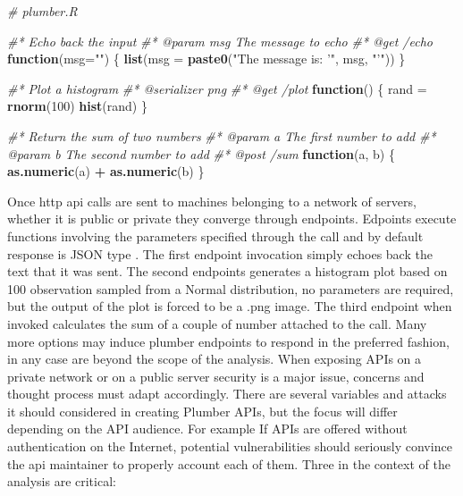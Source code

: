 \documentclass[
  12pt,
  a4paper,
  oneside]{book}
\newenvironment{Shaded}{\begin{snugshade}}{\end{snugshade}}
\newcommand{\CommentTok}[1]{\textcolor[rgb]{0.56,0.35,0.01}{\textit{#1}}}
\newcommand{\ControlFlowTok}[1]{\textcolor[rgb]{0.13,0.29,0.53}{\textbf{#1}}}
\newcommand{\DataTypeTok}[1]{\textcolor[rgb]{0.13,0.29,0.53}{#1}}
\newcommand{\DecValTok}[1]{\textcolor[rgb]{0.00,0.00,0.81}{#1}}
\newcommand{\KeywordTok}[1]{\textcolor[rgb]{0.13,0.29,0.53}{\textbf{#1}}}
\newcommand{\NormalTok}[1]{#1}
\newcommand{\OperatorTok}[1]{\textcolor[rgb]{0.81,0.36,0.00}{\textbf{#1}}}
\newcommand{\StringTok}[1]{\textcolor[rgb]{0.31,0.60,0.02}{#1}}
\theoremstyle{definition}
\theoremstyle{definition}
\theoremstyle{definition}
\theoremstyle{remark}
\begin{document}
\begin{Shaded}
\begin{Highlighting}[]
\CommentTok{# plumber.R}

\CommentTok{#* Echo back the input}
\CommentTok{#* @param msg The message to echo}
\CommentTok{#* @get /echo}
\ControlFlowTok{function}\NormalTok{(}\DataTypeTok{msg=}\StringTok{""}\NormalTok{) \{}
  \KeywordTok{list}\NormalTok{(}\DataTypeTok{msg =} \KeywordTok{paste0}\NormalTok{(}\StringTok{"The message is: '"}\NormalTok{, msg, }\StringTok{"'"}\NormalTok{))}
\NormalTok{\}}

\CommentTok{#* Plot a histogram}
\CommentTok{#* @serializer png}
\CommentTok{#* @get /plot}
\ControlFlowTok{function}\NormalTok{() \{}
\NormalTok{  rand =}\StringTok{ }\KeywordTok{rnorm}\NormalTok{(}\DecValTok{100}\NormalTok{)}
  \KeywordTok{hist}\NormalTok{(rand)}
\NormalTok{\}}

\CommentTok{#* Return the sum of two numbers}
\CommentTok{#* @param a The first number to add}
\CommentTok{#* @param b The second number to add}
\CommentTok{#* @post /sum}
\ControlFlowTok{function}\NormalTok{(a, b) \{}
  \KeywordTok{as.numeric}\NormalTok{(a) }\OperatorTok{+}\StringTok{ }\KeywordTok{as.numeric}\NormalTok{(b)}
\NormalTok{\}}
\end{Highlighting}
\end{Shaded}

Once http api calls are sent to machines belonging to a network of servers, whether it is public or private they converge through endpoints. Edpoints execute functions involving the parameters specified through the call and by default response is JSON type . The first endpoint invocation simply echoes back the text that it was sent. The second endpoints generates a histogram plot based on 100 observation sampled from a Normal distribution, no parameters are required, but the output of the plot is forced to be a .png image. The third endpoint when invoked calculates the sum of a couple of number attached to the call.
Many more options may induce plumber endpoints to respond in the preferred fashion, in any case are beyond the scope of the analysis.
When exposing APIs on a private network or on a public server security is a major issue, concerns and thought process must adapt accordingly. There are several variables and attacks it should considered in creating Plumber APIs, but the focus will differ depending on the API audience. For example If APIs are offered without authentication on the Internet, potential vulnerabilities should seriously convince the api maintainer to properly account each of them. Three in the context of the analysis are critical:
\end{document}
